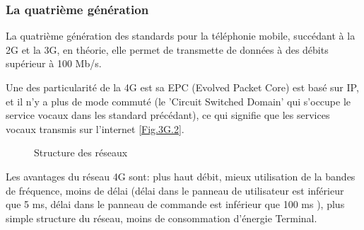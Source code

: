 \subsubsection{La quatrième génération}
La quatrième génération des standards pour la téléphonie mobile, succédant à la 2G et la 3G, en théorie, elle permet de transmette de données à des débits supérieur à 100 Mb/s. 

Une des particularité de la 4G est sa EPC (Evolved Packet Core) est basé sur IP, et il n'y a plus de mode commuté (le 'Circuit Switched Domain' qui s'occupe le service vocaux dans les standard précédant), ce qui signifie que les services vocaux transmis sur l'internet \ref{Fig.3G.2}. 


\begin{figure}[H]
	\centering
	\hfill		
	\hspace{1in}
	\caption{Structure des réseaux} 
		\label{Fig.3G}
\end{figure}
Les avantages du réseau 4G sont:  plus haut débit, mieux utilisation de la bandes de fréquence, moins de délai (délai dans le panneau de utilisateur est inférieur que 5 ms, délai dans le panneau de commande est inférieur que 100 ms ), plus simple structure du réseau, moins de consommation d'énergie Terminal.

